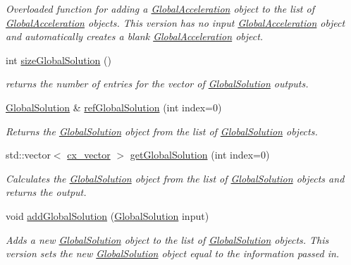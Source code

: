 \begin{DoxyCompactItemize}
\begin{DoxyCompactList}\small\item\em Overloaded function for adding a \hyperlink{classosea_1_1ofreq_1_1_global_acceleration}{Global\-Acceleration} object to the list of \hyperlink{classosea_1_1ofreq_1_1_global_acceleration}{Global\-Acceleration} objects. This version has no input \hyperlink{classosea_1_1ofreq_1_1_global_acceleration}{Global\-Acceleration} object and automatically creates a blank \hyperlink{classosea_1_1ofreq_1_1_global_acceleration}{Global\-Acceleration} object. \end{DoxyCompactList}\item 
int \hyperlink{classosea_1_1ofreq_1_1_outputs_body_abe9227589bf83ee0ff40251e6e0d8d27}{size\-Global\-Solution} ()
\begin{DoxyCompactList}\small\item\em returns the number of entries for the vector of \hyperlink{classosea_1_1ofreq_1_1_global_solution}{Global\-Solution} outputs. \end{DoxyCompactList}\item 
\hyperlink{classosea_1_1ofreq_1_1_global_solution}{Global\-Solution} \& \hyperlink{classosea_1_1ofreq_1_1_outputs_body_a7480b88e4d67c84a2c540127c93a15d2}{ref\-Global\-Solution} (int index=0)
\begin{DoxyCompactList}\small\item\em Returns the \hyperlink{classosea_1_1ofreq_1_1_global_solution}{Global\-Solution} object from the list of \hyperlink{classosea_1_1ofreq_1_1_global_solution}{Global\-Solution} objects. \end{DoxyCompactList}\item 
std\-::vector$<$ \hyperlink{namespaceosea_1_1ofreq_a42bf1d8bbba99693142c4184486ad3e0}{cx\-\_\-vector} $>$ \hyperlink{classosea_1_1ofreq_1_1_outputs_body_a0f669819a398d64524a4aff29e20aa8b}{get\-Global\-Solution} (int index=0)
\begin{DoxyCompactList}\small\item\em Calculates the \hyperlink{classosea_1_1ofreq_1_1_global_solution}{Global\-Solution} object from the list of \hyperlink{classosea_1_1ofreq_1_1_global_solution}{Global\-Solution} objects and returns the output. \end{DoxyCompactList}\item 
void \hyperlink{classosea_1_1ofreq_1_1_outputs_body_a75283b4dd4533851008431eb84341919}{add\-Global\-Solution} (\hyperlink{classosea_1_1ofreq_1_1_global_solution}{Global\-Solution} input)
\begin{DoxyCompactList}\small\item\em Adds a new \hyperlink{classosea_1_1ofreq_1_1_global_solution}{Global\-Solution} object to the list of \hyperlink{classosea_1_1ofreq_1_1_global_solution}{Global\-Solution} objects. This version sets the new \hyperlink{classosea_1_1ofreq_1_1_global_solution}{Global\-Solution} object equal to the information passed in. \end{DoxyCompactList}\item 

\end{DoxyCompactItemize}
